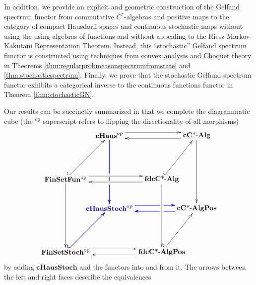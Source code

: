\documentclass[12pt]{article}
\theoremstyle{theorem}
\theoremstyle{definition}
\numberwithin{equation}{section}
\newcommand{\be}{\begin{equation}}
\newcommand{\ee}{\end{equation}}
\newcommand{\<}{\langle}
\renewcommand{\>}{\rangle}
\newcommand{\cCAlg}{\mathbf{cC\text{*-}Alg}}
\newcommand{\fdcCAlg}{\mathbf{fdcC\text{*-}Alg}}
\newcommand{\cCAlgPos}{\mathbf{cC\text{*-}AlgPos}}
\newcommand{\fdcCAlgPos}{\mathbf{fdcC\text{*-}AlgPos}}
\newcommand{\FinSetFun}{\mathbf{FinSetFun}}
\newcommand{\FinSetStoch}{\mathbf{FinSetStoch}}
\newcommand{\op}{\mathrm{op}}
\newcommand{\cH}{\mathbf{cHaus}}
\newcommand{\cHStoch}{\mathbf{cHausStoch}}
\begin{document}
In addition, we provide
an explicit and geometric construction of the Gelfand spectrum functor from 
commutative $C^*$-algebras and positive maps to the category of 
compact Hausdorff spaces and continuous stochastic maps
without using the using algebras of functions and without 
appealing to the Riesz-Markov-Kakutani 
Representation Theorem.
Instead, this ``stochastic'' Gelfand spectrum functor
is constructed using techniques from convex analysis and Choquet theory
in Theorems \ref{thm:regularprobmeasonspectrumfromstate} and 
\ref{thm:stochasticspectrum}. 
Finally, we prove
that the stochastic Gelfand spectrum functor exhibits a categorical inverse 
to the continuous functions functor in Theorem 
\ref{thm:stochasticGN}. 

Our results can be succinctly summarized in that we complete the diagrammatic cube 
(the ${}^{\op}$ superscript refers to flipping the directionality of all morphisms)
\be
\label{eq:thecube}
\xy0;/r.35pc/:
(-15,20)*+{\cH^{\op}}="cHaus";
(-15,-5)*+{\color{blue}\cHStoch^{\op}}="cHausStoch";
(15,20)*+{\cCAlg}="cCAlg";
(15,-5)*+{\cCAlgPos}="cCAlgPos";
(-30,5)*+{\FinSetFun^{\op}}="FinSetFun";
(-30,-20)*+{\FinSetStoch^{\op}}="FinSetStoch";
(3,5)*+{\fdcCAlg}="fdcCAlg";
(3,-20)*+{\fdcCAlgPos}="fdcCAlgPos";
{\ar@<1.0ex>"cHaus";"cCAlg"};
{\ar@<1.0ex>"cCAlg";"cHaus"};
{\ar@<0.95ex>|(0.6){\hole}@[blue]"cHausStoch";"cCAlgPos"};
{\ar@<1.0ex>|(0.6){\hole}@[blue]"cHausStoch";"cCAlgPos"};
{\ar@<1.05ex>|(0.6){\hole}@[blue]"cHausStoch";"cCAlgPos"};
{\ar@<0.95ex>|(0.4){\hole}@[blue]"cCAlgPos";"cHausStoch"};
{\ar@<1.0ex>|(0.4){\hole}@[blue]"cCAlgPos";"cHausStoch"};
{\ar@<1.05ex>|(0.4){\hole}@[blue]"cCAlgPos";"cHausStoch"};
{\ar@<1.0ex>"FinSetFun";"fdcCAlg"};
{\ar@<1.0ex>"fdcCAlg";"FinSetFun"};
{\ar@<1.0ex>"FinSetStoch";"fdcCAlgPos"};
{\ar@<1.0ex>"fdcCAlgPos";"FinSetStoch"};
{\ar@{^{(}->}"FinSetFun";"cHaus"};
{\ar@<-0.05ex>@{^{(}->}@[blue]"FinSetStoch";"cHausStoch"};
{\ar@{^{(}->}@[blue]"FinSetStoch";"cHausStoch"};
{\ar@<0.05ex>@{^{(}->}@[blue]"FinSetStoch";"cHausStoch"};
{\ar@{^{(}->}"fdcCAlg";"cCAlg"};
{\ar@{^{(}->}"fdcCAlgPos";"cCAlgPos"};
{\ar"FinSetFun";"FinSetStoch"};
{\ar@<-0.05ex>|(0.55){\hole}|(0.65){\hole}@[blue]"cHaus";"cHausStoch"};
{\ar|(0.55){\hole}|(0.65){\hole}@[blue]"cHaus";"cHausStoch"};
{\ar@<0.05ex>|(0.55){\hole}|(0.65){\hole}@[blue]"cHaus";"cHausStoch"};
{\ar"fdcCAlg";"fdcCAlgPos"};
{\ar"cCAlg";"cCAlgPos"};
\endxy
\ee
by adding $\cHStoch$ and the functors into and from it. 
The arrows between the left and right faces describe the equivalences
\end{document}
